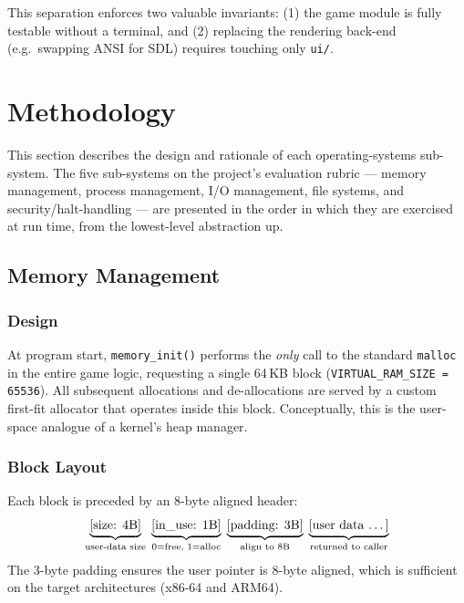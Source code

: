 \documentclass[conference]{IEEEtran}
\begin{document}
This separation enforces two valuable invariants: (1) the game module is fully testable without a terminal, and (2) replacing the rendering back-end (e.g.\ swapping ANSI for SDL) requires touching only \texttt{ui/}.

\section{Methodology}
\label{sec:methodology}

This section describes the design and rationale of each operating-systems sub-system. The five sub-systems on the project's evaluation rubric --- memory management, process management, I/O management, file systems, and security/halt-handling --- are presented in the order in which they are exercised at run time, from the lowest-level abstraction up.

\subsection{Memory Management}
\label{sec:mem}

\subsubsection{Design}
At program start, \texttt{memory\_init()} performs the \emph{only} call to the standard \texttt{malloc} in the entire game logic, requesting a single 64\,KB block (\texttt{VIRTUAL\_RAM\_SIZE = 65536}). All subsequent allocations and de-allocations are served by a custom first-fit allocator that operates inside this block. Conceptually, this is the user-space analogue of a kernel's heap manager.

\subsubsection{Block Layout}
Each block is preceded by an 8-byte aligned header:
\begin{equation*}
\underbrace{[\text{size: 4B}]}_{\text{user-data size}} \;
\underbrace{[\text{in\_use: 1B}]}_{\text{0=free, 1=alloc}} \;
\underbrace{[\text{padding: 3B}]}_{\text{align to 8B}} \;
\underbrace{[\text{user data \dots}]}_{\text{returned to caller}}
\end{equation*}
The 3-byte padding ensures the user pointer is 8-byte aligned, which is sufficient on the target architectures (x86-64 and ARM64).
\end{document}
